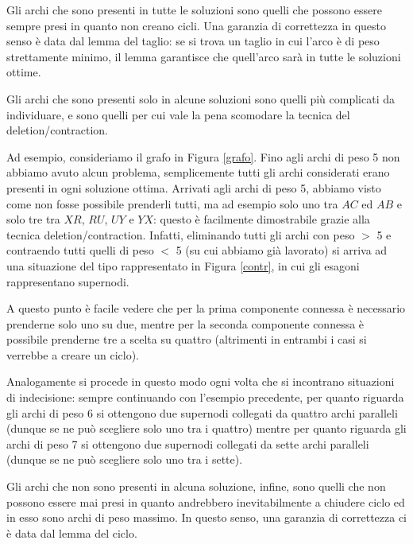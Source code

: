 \documentclass[12pt,a4paper,twoside]{article}
\theoremstyle{definition}
\theoremstyle{definition}
\theoremstyle{theorem}
\begin{document}
	Gli archi che sono presenti in tutte le soluzioni sono quelli che possono essere sempre presi in quanto non creano cicli. Una garanzia di correttezza in questo senso è data dal lemma del taglio: se si trova un taglio in cui l'arco è di peso strettamente minimo, il lemma garantisce che quell'arco sarà in tutte le soluzioni ottime.
	
	Gli archi che sono presenti solo in alcune soluzioni sono quelli più complicati da individuare, e sono quelli per cui vale la pena scomodare la tecnica del deletion/contraction.
	
	Ad esempio, consideriamo il grafo in Figura \ref{grafo}. Fino agli archi di peso 5 non abbiamo avuto alcun problema, semplicemente tutti gli archi considerati erano presenti in ogni soluzione ottima. Arrivati agli archi di peso 5, abbiamo visto come non fosse possibile prenderli tutti, ma ad esempio solo uno tra $AC$ ed $AB$ e solo tre tra $XR$, $RU$, $UY$ e $YX$: questo è facilmente dimostrabile grazie alla tecnica deletion/contraction. Infatti, eliminando tutti gli archi con peso $>$ 5 e contraendo tutti quelli di peso $<$ 5 (su cui abbiamo già lavorato) si arriva ad una situazione del tipo rappresentato in Figura \ref{contr}, in cui gli esagoni rappresentano supernodi.
	
	A questo punto è facile vedere che per la prima componente connessa è necessario prenderne solo uno su due, mentre per la seconda componente connessa è possibile prenderne tre a scelta su quattro (altrimenti in entrambi i casi si verrebbe a creare un ciclo).
	
	Analogamente si procede in questo modo ogni volta che si incontrano situazioni di indecisione: sempre continuando con l'esempio precedente, per quanto riguarda gli archi di peso 6 si ottengono due supernodi collegati da quattro archi paralleli (dunque se ne può scegliere solo uno tra i quattro) mentre per quanto riguarda gli archi di peso 7 si ottengono due supernodi collegati da sette archi paralleli (dunque se ne può scegliere solo uno tra i sette).
	
	Gli archi che non sono presenti in alcuna soluzione, infine, sono quelli che non possono essere mai presi in quanto andrebbero inevitabilmente a chiudere ciclo ed in esso sono archi di peso massimo. In questo senso, una garanzia di correttezza ci è data dal lemma del ciclo.
	
\end{document}
